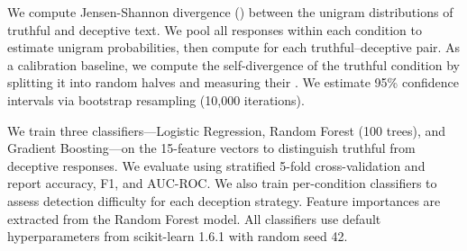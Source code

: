 We compute Jensen-Shannon divergence (\jsd) between the unigram distributions of truthful and deceptive text. We pool all responses within each condition to estimate unigram probabilities, then compute \jsd for each truthful--deceptive pair. As a calibration baseline, we compute the self-divergence of the truthful condition by splitting it into random halves and measuring their \jsd. We estimate 95\% confidence intervals via bootstrap resampling (10,000 iterations).

We train three classifiers---Logistic Regression, Random Forest (100 trees), and Gradient Boosting---on the 15-feature vectors to distinguish truthful from deceptive responses. We evaluate using stratified 5-fold cross-validation and report accuracy, F1, and AUC-ROC. We also train per-condition classifiers to assess detection difficulty for each deception strategy. Feature importances are extracted from the Random Forest model. All classifiers use default hyperparameters from scikit-learn 1.6.1 with random seed 42.
